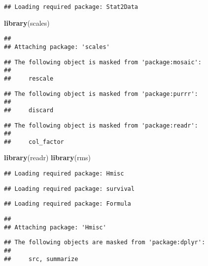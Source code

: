 \documentclass[]{article}
\newenvironment{Shaded}{\begin{snugshade}}{\end{snugshade}}
\newcommand{\KeywordTok}[1]{\textcolor[rgb]{0.13,0.29,0.53}{\textbf{#1}}}
\newcommand{\NormalTok}[1]{#1}
\begin{document}
\begin{verbatim}
## Loading required package: Stat2Data
\end{verbatim}

\begin{Shaded}
\begin{Highlighting}[]
\KeywordTok{library}\NormalTok{(scales)}
\end{Highlighting}
\end{Shaded}

\begin{verbatim}
## 
## Attaching package: 'scales'
\end{verbatim}

\begin{verbatim}
## The following object is masked from 'package:mosaic':
## 
##     rescale
\end{verbatim}

\begin{verbatim}
## The following object is masked from 'package:purrr':
## 
##     discard
\end{verbatim}

\begin{verbatim}
## The following object is masked from 'package:readr':
## 
##     col_factor
\end{verbatim}

\begin{Shaded}
\begin{Highlighting}[]
\KeywordTok{library}\NormalTok{(readr)}
\KeywordTok{library}\NormalTok{(rms)}
\end{Highlighting}
\end{Shaded}

\begin{verbatim}
## Loading required package: Hmisc
\end{verbatim}

\begin{verbatim}
## Loading required package: survival
\end{verbatim}

\begin{verbatim}
## Loading required package: Formula
\end{verbatim}

\begin{verbatim}
## 
## Attaching package: 'Hmisc'
\end{verbatim}

\begin{verbatim}
## The following objects are masked from 'package:dplyr':
## 
##     src, summarize
\end{verbatim}
\end{document}
